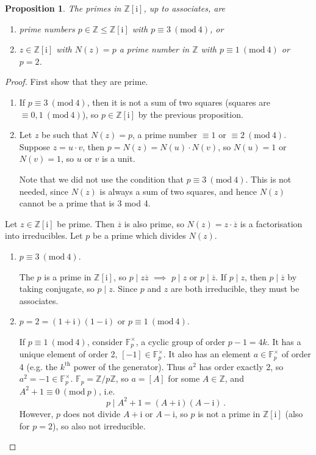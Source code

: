 \documentclass{article}
\theoremstyle{plain}\theoremheaderfont{\normalfont\itshape}\theorembodyfont{\rmfamily}\theoremseparator{.}\newtheorem*{rem}{Remark}\newtheorem*{ex}{Example}\newtheorem*{proof}{Proof}\newtheorem*{altp}{Alternative proof}\newtheorem*{nonex}{Non-Example}
\theoremstyle{plain}\theoremheaderfont{\normalfont\bfseries}\theorembodyfont{\rmfamily}\theoremseparator{.}\newtheorem{thm}{Theorem}[section]\newtheorem{lem}[thm]{Lemma}\newtheorem{prop}[thm]{Proposition}\newtheorem*{cor}{Corollary}\newtheorem{defn}[thm]{Definition}\newtheorem{clm}[thm]{Claim}\newtheorem{clminproof}{Claim}\newtheorem*{notn}{Notation}\newtheorem*{exer}{Exercise}\newtheorem*{lemnn}{Lemma}
\theoremstyle{break}\theoremheaderfont{\normalfont\itshape}\theorembodyfont{\rmfamily}\theoremseparator{.\medskip}\newtheorem*{proofskip}{Proof}\newtheorem*{exs}{Examples}\newtheorem*{rems}{Remarks}\newtheorem*{obs}{Observations}
\theoremstyle{break}\theoremheaderfont{\normalfont\bfseries}\theorembodyfont{\rmfamily}\theoremseparator{.\medskip}\newtheorem{lemskip}[thm]{Lemma}\newtheorem{defnskip}[thm]{Definition}\newtheorem{propskip}[thm]{Proposition}\newtheorem{thmskip}[thm]{Theorem}
\numberwithin{equation}{section}
\newcommand{\ii}{\mathrm{i}}
\newcommand{\ZZ}{\mathbb{Z}}
\newcommand{\FF}{\mathbb{F}}
\newcommand{\MOD}[1]{\ (\mathrm{mod} \ #1)}
\begin{document}
    \begin{prop}
        The primes in \(\ZZ[\ii]\), up to associates, are
        \begin{enumerate}[topsep=0pt,label=(\roman*)]
            \item prime numbers \(p\in\ZZ\le\ZZ[\ii]\) with \(p\equiv 3\MOD{4}\), or
            \item \(z\in\ZZ[\ii]\) with \(N(z)=p\) a prime number in \(\ZZ\) with \(p\equiv 1\MOD{4}\) or \(p=2\).
        \end{enumerate}
    \end{prop}
    \begin{proof}
        First show that they are prime.
        \begin{enumerate}[topsep=0pt,label=(\roman*)]
            \item If \(p\equiv 3\MOD{4}\), then it is not a sum of two squares (squares are \(\equiv 0,1\MOD{4}\)), so \(p\in\ZZ[\ii]\) by the previous proposition.
            \item Let \(z\) be such that \(N(z)=p\), a prime number \(\equiv 1\) or \(\equiv 2\MOD{4}\). Suppose \(z=u\cdot v\), then \(p=N(z)=N(u)\cdot N(v)\), so \(N(u)=1\) or \(N(v)=1\), so \(u\) or \(v\) is a unit.
            
            Note that we did not use the condition that \(p\equiv 3 \MOD{4}\). This is not needed, since \(N(z)\) is always a sum of two squares, and hence \(N(z)\) cannot be a prime that is 3 mod 4.
        \end{enumerate}

        Let \(z\in\ZZ[\ii]\) be prime. Then \(\overline{z}\) is also prime, so \(N(z)=z\cdot\overline{z}\) is a factorisation into irreducibles. Let \(p\) be a prime which divides \(N(z)\).
        \begin{enumerate}[topsep=0pt,label=(\roman*)]
            \item \(p\equiv 3\MOD{4}\).
            
            The \(p\) is a prime in \(\ZZ[\ii]\), so \(p\mid z\overline{z}\) \(\implies\) \(p\mid z\) or \(p\mid\overline{z}\). If \(p\mid z\), then \(p\mid\overline{z}\) by taking conjugate, so \(p\mid z\). Since \(p\) and \(z\) are both irreducible, they must be associates.
            \item \(p=2=(1+\ii)(1-\ii)\) or \(p\equiv 1\MOD{4}\).
            
            If \(p\equiv 1\MOD{4}\), consider \(\FF_p^\times\), a cyclic group of order \(p-1=4k\). It has a unique element of order 2, \([-1]\in\FF_p^\times\). It also has an element \(a\in\FF_p^\times\) of order 4 (e.g. the \(k^{\text{th}}\) power of the generator). Thus \(a^2\) has order exactly 2, so \(a^2=-1\in\FF_p^\times\). \(\FF_p=\ZZ/p\ZZ\), so \(a=[A]\) for some \(A\in\ZZ\), and \(A^2+1\equiv 0\MOD{p}\), i.e.
            \[p\mid A^2+1=(A+\ii)(A-\ii)\,.\]
            However, \(p\) does not divide \(A+\ii\) or \(A-\ii\), so \(p\) is not a prime in \(\ZZ[\ii]\) (also for \(p=2\)), so also not irreducible.


\end{enumerate}
\end{proof}
\end{document}

